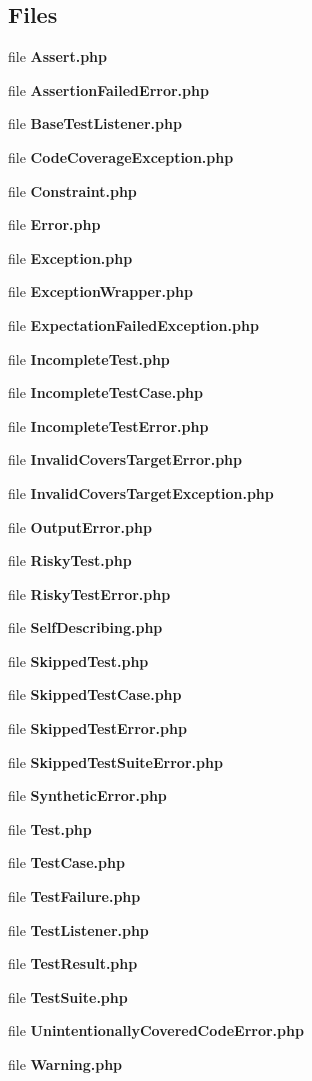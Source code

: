 \subsection*{Files}
\begin{DoxyCompactItemize}
\item 
file {\bf Assert.\+php}
\item 
file {\bf Assertion\+Failed\+Error.\+php}
\item 
file {\bf Base\+Test\+Listener.\+php}
\item 
file {\bf Code\+Coverage\+Exception.\+php}
\item 
file {\bf Constraint.\+php}
\item 
file {\bf Error.\+php}
\item 
file {\bf Exception.\+php}
\item 
file {\bf Exception\+Wrapper.\+php}
\item 
file {\bf Expectation\+Failed\+Exception.\+php}
\item 
file {\bf Incomplete\+Test.\+php}
\item 
file {\bf Incomplete\+Test\+Case.\+php}
\item 
file {\bf Incomplete\+Test\+Error.\+php}
\item 
file {\bf Invalid\+Covers\+Target\+Error.\+php}
\item 
file {\bf Invalid\+Covers\+Target\+Exception.\+php}
\item 
file {\bf Output\+Error.\+php}
\item 
file {\bf Risky\+Test.\+php}
\item 
file {\bf Risky\+Test\+Error.\+php}
\item 
file {\bf Self\+Describing.\+php}
\item 
file {\bf Skipped\+Test.\+php}
\item 
file {\bf Skipped\+Test\+Case.\+php}
\item 
file {\bf Skipped\+Test\+Error.\+php}
\item 
file {\bf Skipped\+Test\+Suite\+Error.\+php}
\item 
file {\bf Synthetic\+Error.\+php}
\item 
file {\bf Test.\+php}
\item 
file {\bf Test\+Case.\+php}
\item 
file {\bf Test\+Failure.\+php}
\item 
file {\bf Test\+Listener.\+php}
\item 
file {\bf Test\+Result.\+php}
\item 
file {\bf Test\+Suite.\+php}
\item 
file {\bf Unintentionally\+Covered\+Code\+Error.\+php}
\item 
file {\bf Warning.\+php}
\end{DoxyCompactItemize}
